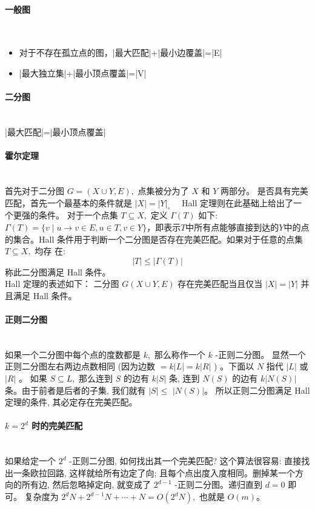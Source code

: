 \paragraph{一般图}~{}
\\
\begin{itemize}
\item 对于不存在孤立点的图，|最大匹配|+|最小边覆盖|=|E|
\item |最大独立集|+|最小顶点覆盖|=|V|
\end{itemize}

\paragraph{二分图}~{}
\\
|最大匹配|=|最小顶点覆盖|
\paragraph{霍尔定理}~{}
\\
首先对于二分图 $G=(X \cup Y, E),$ 点集被分为了 $X$ 和 $Y$ 两部分。 是否具有完美匹配，首先一个最基本的条件就是 $|X|=|Y|_{\circ} \quad$ Hall 定理则在此基础上给出了一个更强的条件。 对于一个点集 $T \subseteq X,$ 定义 $\Gamma(T)$ 如下:$\Gamma(T)=\{v \mid u \rightarrow v \in E, u \in T, v \in Y\}$，即表示$T$中所有点能够直接到达的$Y$中的点的集合。Hall 条件用于判断一个二分图是否存在完美匹配。如果对于任意的点集 $T \subseteq X,$ 均存 在:
$$
|T| \leq|\Gamma(T)|
$$
称此二分图满足 Hall 条件。\\
Hall 定理的表述如下：
二分图 $G(X \cup Y, E)$ 存在完美匹配当且仅当 $|X|=|Y|$ 并且满足 Hall 条件。

\paragraph{正则二分图}~{}
\\
如果一个二分图中每个点的度数都是 $k,$ 那么称作一个 $k$ -正则二分图。
显然一个正则二分图左右两边点数相同 (因为边数 $=k|L|=k|R|$ ) 。下面以 $N$ 指代 $|L|$ 或 $|R|$ 。
如果 $S \subseteq L,$ 那么连到 $S$ 的边有 $k|S|$ 条, 连到 $N(S)$ 的边有 $k|N(S)|$ 条。由于前者是后者的子集, 我们就有 $|S| \leq$ $|N(S)|$。
所以正则二分图满足 Hall 定理的条件, 其必定存在完美匹配。
\paragraph{$k=2^{d}$ 时的完美匹配}~{}
\\
如果给定一个 $2^{d}$ -正则二分图, 如何找出其一个完美匹配?
这个算法很容易: 直接找出一条欧拉回路, 这样就给所有边定了向; 且每个点出度入度相同。删掉某一个方向的所有边, 然后忽略掉定向, 就变成了 $2^{d-1}$ -正则二分图。递归直到 $d=0$ 即可。
复杂度为 $2^{d} N+2^{d-1} N+\cdots+N=O\left(2^{d} N\right),$ 也就是 $O(m)$。
